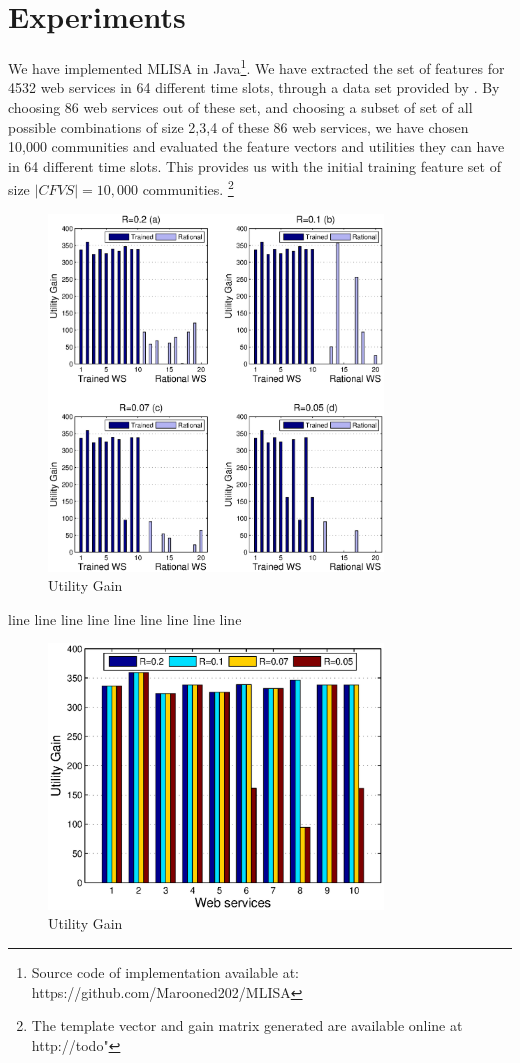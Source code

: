 \documentclass[10pt,journal,cspaper,compsoc]{IEEEtran}
\begin{document}
\section{Experiments}\label{s:experiments}
We have implemented MLISA in Java\footnote{Source code of implementation available at: https://github.com/Marooned202/MLISA}. We have extracted the set of features for 4532 web services in 64 different time slots, through a data set provided by \cite{10.1109/ISSRE.2011.17}. By choosing 86 web services out of these set, and choosing a subset of set of all possible combinations of size 2,3,4 of these 86 web services, we have chosen 10,000 communities and evaluated the feature vectors and utilities they can have in 64 different time slots. This provides us with the initial training feature set of size $|CFVS| = 10,000$ communities. \footnote {The template vector and gain matrix generated are available online at http://todo"}

\begin{figure}%
\centering
\includegraphics[width=3.5in]{figures/utility_gain.eps}
\caption{Utility Gain}
\label{utility_gain1}
\end{figure}

line line line
line line line
line line line

\begin{figure}%
\centering
\includegraphics[width=3.5in]{figures/utility_gain_r.eps}
\caption{Utility Gain}
\label{utility_gain2}
\end{figure}
\end{document}

